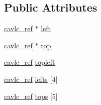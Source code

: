 \subsection*{Public Attributes}
\begin{DoxyCompactItemize}
\item 
\hyperlink{structtag__cavlc__ref}{cavlc\_\-ref} $\ast$ \hyperlink{structtag__cavlc__ref__list_a854c970004394513901757cc3dcb65e5}{left}
\item 
\hyperlink{structtag__cavlc__ref}{cavlc\_\-ref} $\ast$ \hyperlink{structtag__cavlc__ref__list_af93b34de26224281e33b951333a665c7}{top}
\item 
\hyperlink{structtag__cavlc__ref}{cavlc\_\-ref} \hyperlink{structtag__cavlc__ref__list_ac71d66d925cb5fbc0c15812f70aa2e78}{topleft}
\item 
\hyperlink{structtag__cavlc__ref}{cavlc\_\-ref} \hyperlink{structtag__cavlc__ref__list_ae9fad3ab9c8086e7dd826492ee027b7d}{lefts} \mbox{[}4\mbox{]}
\item 
\hyperlink{structtag__cavlc__ref}{cavlc\_\-ref} \hyperlink{structtag__cavlc__ref__list_ab4d9282dda63bfa7f48cff76db26de04}{tops} \mbox{[}5\mbox{]}
\end{DoxyCompactItemize}


